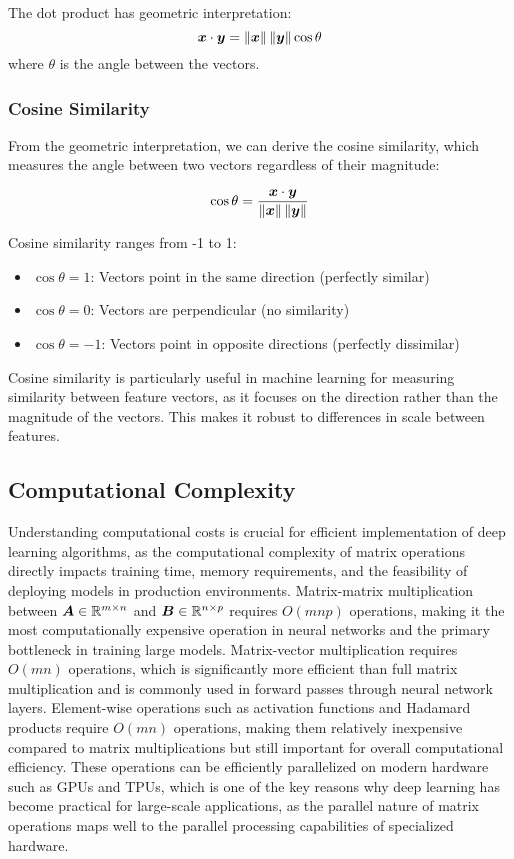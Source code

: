 The dot product has geometric interpretation:
\begin{equation}
    \boldsymbol{x} \cdot \boldsymbol{y} = \left\lVert\boldsymbol{x}\right\rVert \left\lVert\boldsymbol{y}\right\rVert \cos\theta
\end{equation}
where $\theta$ is the angle between the vectors.

\subsubsection{Cosine Similarity}

From the geometric interpretation, we can derive the cosine similarity, which measures the angle between two vectors regardless of their magnitude:

\begin{equation}
    \cos\theta = \frac{\boldsymbol{x} \cdot \boldsymbol{y}}{\left\lVert\boldsymbol{x}\right\rVert \left\lVert\boldsymbol{y}\right\rVert}
\end{equation}

Cosine similarity ranges from -1 to 1:
\begin{itemize}
    \item $\cos\theta = 1$: Vectors point in the same direction (perfectly similar)
    \item $\cos\theta = 0$: Vectors are perpendicular (no similarity)
    \item $\cos\theta = -1$: Vectors point in opposite directions (perfectly dissimilar)
\end{itemize}

Cosine similarity is particularly useful in machine learning for measuring similarity between feature vectors, as it focuses on the direction rather than the magnitude of the vectors. This makes it robust to differences in scale between features.

\subsection{Computational Complexity}

Understanding computational costs is crucial for efficient implementation of deep learning algorithms, as the computational complexity of matrix operations directly impacts training time, memory requirements, and the feasibility of deploying models in production environments. Matrix-matrix multiplication between $\boldsymbol{A} \in \mathbb{R}^{m \times n}$ and $\boldsymbol{B} \in \mathbb{R}^{n \times p}$ requires $O(mnp)$ operations, making it the most computationally expensive operation in neural networks and the primary bottleneck in training large models. Matrix-vector multiplication requires $O(mn)$ operations, which is significantly more efficient than full matrix multiplication and is commonly used in forward passes through neural network layers. Element-wise operations such as activation functions and Hadamard products require $O(mn)$ operations, making them relatively inexpensive compared to matrix multiplications but still important for overall computational efficiency. These operations can be efficiently parallelized on modern hardware such as GPUs and TPUs, which is one of the key reasons why deep learning has become practical for large-scale applications, as the parallel nature of matrix operations maps well to the parallel processing capabilities of specialized hardware.

